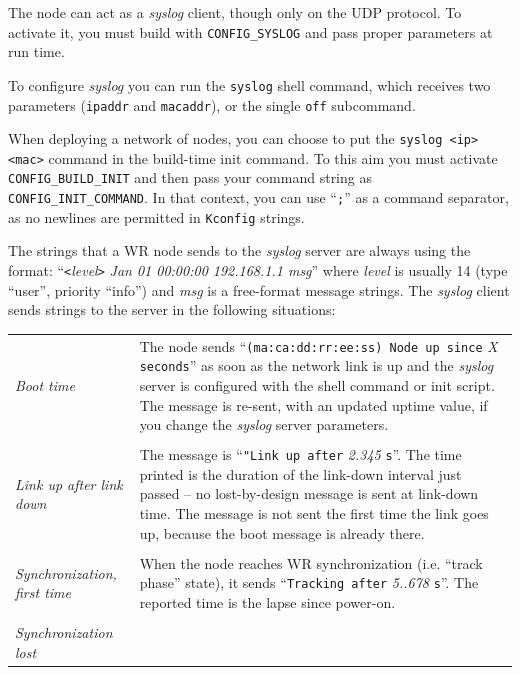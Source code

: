 \documentclass[a4paper, 12pt]{article}
\begin{document}
\begin{sloppypar} %
The node can act as a \textit{syslog} client, though only on the UDP protocol.
To activate it, you must build with \texttt{CONFIG\_SYSLOG} and pass proper
parameters at run time.

To configure \textit{syslog} you can run the \texttt{syslog} shell command, which
receives two parameters (\texttt{ipaddr} and \texttt{macaddr}), or the
single \texttt{off} subcommand.

When deploying a network of nodes, you can choose to put the \texttt{syslog
<ip> <mac>} command in the build-time init command. To this aim you
must activate \texttt{CONFIG\_BUILD\_INIT} and then pass your command string
as \texttt{CONFIG\_INIT\_COMMAND}.  In that context, you can use ``\texttt{;}'' as
a command separator, as no newlines are permitted in \texttt{Kconfig}
strings.

The strings that a WR node sends to the \textit{syslog} server are always
using the format:  ``\texttt{<}\textit{level}\texttt{>} \textit{Jan 01 00:00:00 192.168.1.1 msg}''
where \textit{level} is usually 14 (type ``user'', priority ``info'')
and \textit{msg} is a free-format message strings.
The \textit{syslog} client sends strings to the server in the following
situations:
\begin{longtable}{  p{6.5cm}  p{9cm} }

\textit{ Boot time } &

	The node sends ``\texttt{(ma:ca:dd:rr:ee:ss) Node up since} \textit{X}
        \texttt{seconds}'' as soon as the network link is up and the \textit{syslog}
        server is configured with the shell command or init script.
        The message is re-sent, with an updated uptime value, if you change
        the \textit{syslog} server parameters. \\
& \\
\textit{ Link up after link down } &

	The message is ``\texttt{"Link up after} \textit{2.345} \texttt{s}''. The
        time printed is the duration of the link-down interval just
        passed -- no lost-by-design message is sent at link-down time. The
        message is not sent the first time the link goes up, because
        the boot message is already there.\\
& \\
\textit{ Synchronization, first time } &

	When the node reaches WR synchronization (i.e. ``track phase''
        state), it sends ``\texttt{Tracking after} \textit{5..678} \texttt{s}''.
        The reported time is the lapse since power-on.\\
& \\
\textit{ Synchronization lost } &


\end{longtable}
\end{sloppypar}
\end{document}
